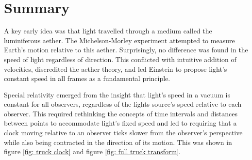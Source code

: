 




\section{Summary}

A key early idea was that light travelled through a medium called the luminiferous aether. The Michelson-Morley experiment attempted to measure Earth's motion relative to this aether. Surprisingly, no difference was found in the speed of light regardless of direction. This conflicted with intuitive addition of velocities, discredited the aether theory, and led Einstein to propose light's constant speed in all frames as a fundamental principle. 

Special relativity emerged from the insight that light's speed in a vacuum is constant for all observers, regardless of the lights source's speed relative to each observer. This required rethinking the concepts of time intervals and distances between points to accommodate light's fixed speed and led to requiring that a clock moving relative to an observer ticks slower from the observer's perspective while also being contracted in the direction of its motion. This was shown in figure \ref{fig: truck clock} and figure \ref{fig: full truck transform}. 

